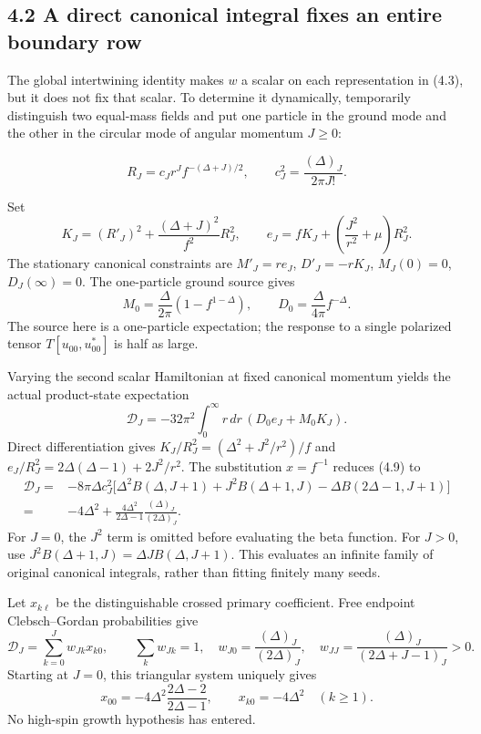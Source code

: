 \documentclass[a4paper,11pt]{article}
\numberwithin{equation}{section}
\begin{document}
\hypertarget{a-direct-canonical-integral-fixes-an-entire-boundary-row}{%
\subsection{4.2 A direct canonical integral fixes an entire boundary row}\label{a-direct-canonical-integral-fixes-an-entire-boundary-row}}

The global intertwining identity makes \(w\) a scalar on each representation in (4.3), but it does not fix that scalar. To determine it dynamically, temporarily distinguish two equal-mass fields and put one particle in the ground mode and the other in the circular mode of angular momentum \(J\ge0\):

\[
R_J=c_Jr^Jf^{-(\Delta+J)/2},\qquad
c_J^2=\frac{(\Delta)_J}{2\pi J!}.
\tag{4.7}
\]

Set \[
K_J=(R'_J)^2+\frac{(\Delta+J)^2}{f^2}R_J^2,\qquad
e_J=fK_J+\left(\frac{J^2}{r^2}+\mu\right)R_J^2 .
\] The stationary canonical constraints are \(M'_J=re_J\), \(D'_J=-rK_J\), \(M_J(0)=0\), \(D_J(\infty)=0\). The one-particle ground source gives \[
M_0=\frac{\Delta}{2\pi}(1-f^{1-\Delta}),\qquad
D_0=\frac{\Delta}{4\pi}f^{-\Delta}.
\tag{4.8}
\] The source here is a one-particle expectation; the response to a single polarized tensor \(T[u_{00},u_{00}^*]\) is half as large.

Varying the second scalar Hamiltonian at fixed canonical momentum yields the actual product-state expectation \[
\mathscr D_J=-32\pi^2\int_0^\infty r\,dr\,
(D_0e_J+M_0K_J).
\tag{4.9}
\] Direct differentiation gives \(K_J/R_J^2=(\Delta^2+J^2/r^2)/f\) and \(e_J/R_J^2=2\Delta(\Delta-1)+2J^2/r^2\). The substitution \(x=f^{-1}\) reduces (4.9) to \[
\begin{aligned}
\mathscr D_J
={}&-8\pi\Delta c_J^2
\bigl[
\Delta^2B(\Delta,J+1)
+J^2B(\Delta+1,J)
-\Delta B(2\Delta-1,J+1)
\bigr]\\
={}&-4\Delta^2+
\frac{4\Delta^2}{2\Delta-1}\frac{(\Delta)_J}{(2\Delta)_J}.
\end{aligned}
\tag{4.10}
\] For \(J=0\), the \(J^2\) term is omitted before evaluating the beta function. For \(J>0\), use \(J^2B(\Delta+1,J)=\Delta J B(\Delta,J+1)\). This evaluates an infinite family of original canonical integrals, rather than fitting finitely many seeds.

Let \(x_{k\ell}\) be the distinguishable crossed primary coefficient. Free endpoint Clebsch--Gordan probabilities give \[
\mathscr D_J=\sum_{k=0}^Jw_{Jk}x_{k0},\qquad
\sum_kw_{Jk}=1,\quad
w_{J0}=\frac{(\Delta)_J}{(2\Delta)_J},\quad
w_{JJ}=\frac{(\Delta)_J}{(2\Delta+J-1)_J}>0.
\tag{4.11}
\] Starting at \(J=0\), this triangular system uniquely gives \[
x_{00}=-4\Delta^2\frac{2\Delta-2}{2\Delta-1},
\qquad x_{k0}=-4\Delta^2\quad(k\ge1).
\tag{4.12}
\] No high-spin growth hypothesis has entered.
\end{document}
